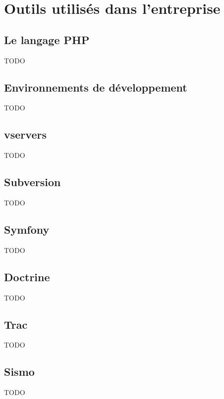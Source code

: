 \section{Outils utilisés dans l'entreprise}

\subsection{Le langage PHP}

TODO

\subsection{Environnements de développement}

TODO

\subsection{vservers}

TODO

\subsection{Subversion}


TODO

\subsection{Symfony}


TODO

\subsection{Doctrine}

TODO

\subsection{Trac}

TODO

\subsection{Sismo}

TODO

